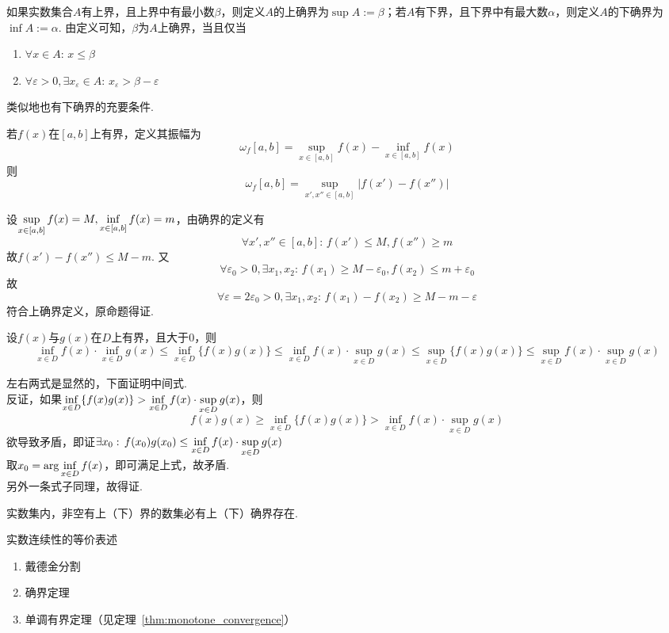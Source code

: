 \begin{definition}[确界]
如果实数集合$A$有上界，且上界中有最小数$\beta$，则定义$A$的上确界为$\sup A:=\beta$；若$A$有下界，且下界中有最大数$\alpha$，则定义$A$的下确界为$\inf A:=\alpha$.
由定义可知，$\beta$为$A$上确界，当且仅当
\begin{enumerate}
	\itemsep -3pt
	\item $\forall x\in A:\,x\leq\beta$
	\item $\forall\varepsilon>0,\exists x_\varepsilon\in A:\,x_\varepsilon >\beta-\varepsilon$
\end{enumerate}
\par 类似地也有下确界的充要条件.
\begin{example}
若$f(x)$在$[a,b]$上有界，定义其振幅为
\[\omega_f[a,b]=\sup_{x\in[a,b]}f(x)-\inf_{x\in[a,b]}f(x)\]
则
\[\omega_f[a,b]=\sup_{x',x''\in[a,b]}|f(x')-f(x'')|\]
\end{example}
\begin{analysis}
设$\displaystyle\sup_{x\in[a,b]}f(x)=M,\inf_{x\in[a,b]}f(x)=m$，由确界的定义有
\[\forall x',x''\in[a,b]:\,f(x')\leq M,f(x'')\geq m\]
故$f(x')-f(x'')\leq M-m$. 又
\[\forall\varepsilon_0>0,\exists x_1,x_2:\,f(x_1)\geq M-\varepsilon_0,f(x_2)\leq m+\varepsilon_0\]
故
\[\forall\varepsilon=2\varepsilon_0>0,\exists x_1,x_2:\,f(x_1)-f(x_2)\geq M-m-\varepsilon\]
符合上确界定义，原命题得证.
\end{analysis}
\begin{example}
\label{ex:inf_sup_inequality}
设$f(x)$与$g(x)$在$D$上有界，且大于$0$，则
\[\inf_{x\in D}f(x)\cdot\inf_{x\in D}g(x)\leq\inf_{x\in D}\{f(x)g(x)\}\leq\inf_{x\in D}f(x)\cdot\sup_{x\in D}g(x)\leq\sup_{x\in D}\{f(x)g(x)\}\leq\sup_{x\in D}f(x)\cdot\sup_{x\in D}g(x)\]
\end{example}
\begin{analysis}
左右两式是显然的，下面证明中间式.\\
反证，如果$\displaystyle\inf_{x\in D}\{f(x)g(x)\}>\inf_{x\in D}f(x)\cdot\sup_{x\in D}g(x)$，则
\[f(x)g(x)\geq\inf_{x\in D}\{f(x)g(x)\}>\inf_{x\in D}f(x)\cdot\sup_{x\in D}g(x)\]
欲导致矛盾，即证$\displaystyle\exists x_0:\,f(x_0)g(x_0)\leq \inf_{x\in D}f(x)\cdot\sup_{x\in D}g(x)$\\
取$\displaystyle x_0=\arg\inf_{x\in D}f(x)$，即可满足上式，故矛盾.\\
另外一条式子同理，故得证.
\end{analysis}
\end{definition}
\begin{theorem}[确界定理]
实数集内，非空有上（下）界的数集必有上（下）确界存在.
\end{theorem}
\par 实数连续性的等价表述
\begin{enumerate}
	\itemsep -3pt
	\item 戴德金分割
	\item 确界定理
	\item 单调有界定理（见定理~\ref{thm:monotone_convergence}）
\end{enumerate}

